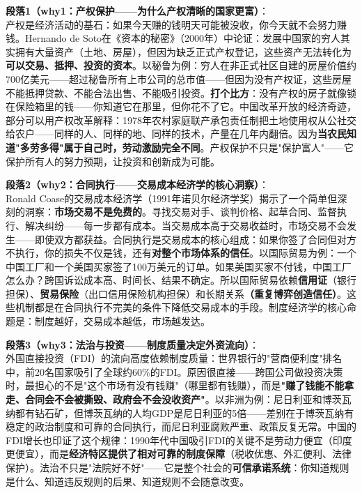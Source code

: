 \documentclass[../main.tex]{subfiles}
\begin{document}
{	\textbf{段落1（why1：产权保护——为什么产权清晰的国家更富）}：\\
	产权是经济活动的基石：如果今天赚的钱明天可能被没收，你今天就不会努力赚钱。Hernando de Soto在《资本的秘密》（2000年）中论证：发展中国家的穷人其实拥有大量资产（土地、房屋），但因为缺乏正式产权登记，这些资产无法转化为\textbf{可以交易、抵押、投资的资本}。以秘鲁为例：穷人在非正式社区自建的房屋价值约700亿美元——超过秘鲁所有上市公司的总市值——但因为没有产权证，这些房屋不能抵押贷款、不能合法出售、不能吸引投资。\textbf{打个比方}：没有产权的房子就像锁在保险箱里的钱——你知道它在那里，但你花不了它。中国改革开放的经济奇迹，部分可以用产权改革解释：1978年农村家庭联产承包责任制把土地使用权从公社交给农户——同样的人、同样的地、同样的技术，产量在几年内翻倍。因为\textbf{当农民知道"多劳多得"属于自己时，劳动激励完全不同}。产权保护不只是"保护富人"——它保护所有人的努力预期，让投资和创新成为可能。

	\textbf{段落2（why2：合同执行——交易成本经济学的核心洞察）}：\\
	Ronald Coase的交易成本经济学（1991年诺贝尔经济学奖）揭示了一个简单但深刻的洞察：\textbf{市场交易不是免费的}。寻找交易对手、谈判价格、起草合同、监督执行、解决纠纷——每一步都有成本。当交易成本高于交易收益时，市场交易不会发生——即使双方都获益。合同执行是交易成本的核心组成：如果你签了合同但对方不执行，你的损失不仅是钱，还有\textbf{对整个市场体系的信任}。以国际贸易为例：一个中国工厂和一个美国买家签了100万美元的订单。如果美国买家不付钱，中国工厂怎么办？跨国诉讼成本高、时间长、结果不确定。所以国际贸易依赖\textbf{信用证}（银行担保）、\textbf{贸易保险}（出口信用保险机构担保）和长期关系\textbf{（重复博弈创造信任）}。这些机制都是在合同执行不完美的条件下降低交易成本的手段。制度经济学的核心命题是：制度越好，交易成本越低，市场越发达。

	\textbf{段落3（why3：法治与投资——制度质量决定外资流向）}：\\
	外国直接投资（FDI）的流向高度依赖制度质量：世界银行的"营商便利度"排名中，前20名国家吸引了全球约60\%的FDI。原因很直接——跨国公司做投资决策时，最担心的不是"这个市场有没有钱赚"（哪里都有钱赚），而是\textbf{"赚了钱能不能拿走、合同会不会被撕毁、政府会不会没收资产"}。以非洲为例：尼日利亚和博茨瓦纳都有钻石矿，但博茨瓦纳的人均GDP是尼日利亚的5倍——差别在于博茨瓦纳有稳定的政治制度和可靠的合同执行，而尼日利亚腐败严重、政策反复无常。中国的FDI增长也印证了这个规律：1990年代中国吸引FDI的关键不是劳动力便宜（印度更便宜），而是\textbf{经济特区提供了相对可靠的制度保障}（税收优惠、外汇便利、法律保护）。法治不只是"法院好不好"——它是整个社会的\textbf{可信承诺系统}：你知道规则是什么、知道违反规则的后果、知道规则不会随意改变。

}
\end{document}
